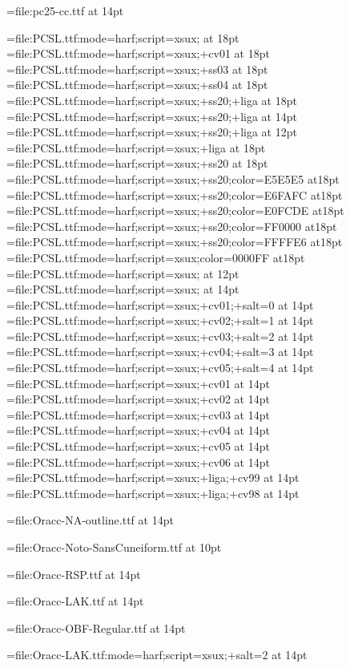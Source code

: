 \font\pccc={file:pc25-cc.ttf} at 14pt

\font\pcxxv={file:PCSL.ttf:mode=harf;script=xsux;} at 18pt
\font\pccvi={file:PCSL.ttf:mode=harf;script=xsux;+cv01} at 18pt
\font\pcssiii={file:PCSL.ttf:mode=harf;script=xsux;+ss03} at 18pt
\font\pcssiv={file:PCSL.ttf:mode=harf;script=xsux;+ss04} at 18pt
\font\pcssXX={file:PCSL.ttf:mode=harf;script=xsux;+ss20;+liga} at 18pt
\font\pcssxx={file:PCSL.ttf:mode=harf;script=xsux;+ss20;+liga} at 14pt
\font\pcssxxx={file:PCSL.ttf:mode=harf;script=xsux;+ss20;+liga} at 12pt
\font\pcxviii={file:PCSL.ttf:mode=harf;script=xsux;+liga} at 18pt
\font\pcssxx={file:PCSL.ttf:mode=harf;script=xsux;+ss20} at 18pt
\font\pceee={file:PCSL.ttf:mode=harf;script=xsux;+ss20;color=E5E5E5} at18pt
\font\pceff={file:PCSL.ttf:mode=harf;script=xsux;+ss20;color=E6FAFC} at18pt
\font\pcefd={file:PCSL.ttf:mode=harf;script=xsux;+ss20;color=E0FCDE} at18pt
\font\pcfee={file:PCSL.ttf:mode=harf;script=xsux;+ss20;color=FF0000} at18pt
\font\pcffe={file:PCSL.ttf:mode=harf;script=xsux;+ss20;color=FFFFE6} at18pt
\font\pcblu={file:PCSL.ttf:mode=harf;script=xsux;color=0000FF} at18pt
\font\pcringop={file:PCSL.ttf:mode=harf;script=xsux;} at 12pt
\font\pcseq={file:PCSL.ttf:mode=harf;script=xsux;} at 14pt
\font\pcseqi={file:PCSL.ttf:mode=harf;script=xsux;+cv01;+salt=0} at 14pt
\font\pcseqii={file:PCSL.ttf:mode=harf;script=xsux;+cv02;+salt=1} at 14pt
\font\pcseqiii={file:PCSL.ttf:mode=harf;script=xsux;+cv03;+salt=2} at 14pt
\font\pcseqiv={file:PCSL.ttf:mode=harf;script=xsux;+cv04;+salt=3} at 14pt
\font\pcseqv={file:PCSL.ttf:mode=harf;script=xsux;+cv05;+salt=4} at 14pt
\font\pccvi={file:PCSL.ttf:mode=harf;script=xsux;+cv01} at 14pt
\font\pccvii={file:PCSL.ttf:mode=harf;script=xsux;+cv02} at 14pt
\font\pccviii={file:PCSL.ttf:mode=harf;script=xsux;+cv03} at 14pt
\font\pccviv={file:PCSL.ttf:mode=harf;script=xsux;+cv04} at 14pt
\font\pccvv={file:PCSL.ttf:mode=harf;script=xsux;+cv05} at 14pt
\font\pccvvi={file:PCSL.ttf:mode=harf;script=xsux;+cv06} at 14pt
\font\pccvxcix={file:PCSL.ttf:mode=harf;script=xsux;+liga;+cv99} at 14pt
\font\pccvxcviii={file:PCSL.ttf:mode=harf;script=xsux;+liga;+cv98} at 14pt

\font\oraccnao={file:Oracc-NA-outline.ttf} at 14pt

\font\oraccnoto={file:Oracc-Noto-SansCuneiform.ttf} at 10pt

\font\oraccrsp={file:Oracc-RSP.ttf} at 14pt

\font\oracclak={file:Oracc-LAK.ttf} at 14pt

\font\oraccobf={file:Oracc-OBF-Regular.ttf} at 14pt

\font\oracclaksaltiii={file:Oracc-LAK.ttf:mode=harf;script=xsux;+salt=2} at 14pt

\let\oraccpc\pcseq

\endinput

